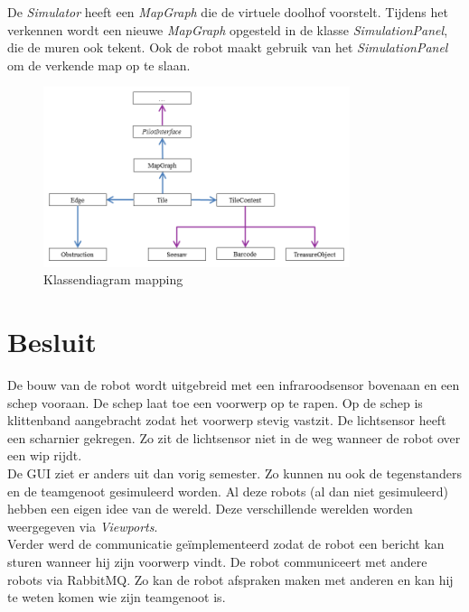 \documentclass[tt2]{penoverslag}
\begin{document}
De \textit{Simulator} heeft een \textit{MapGraph} die de virtuele doolhof voorstelt. Tijdens het verkennen wordt een nieuwe \textit{MapGraph} opgesteld in de klasse \textit{SimulationPanel}, die de muren ook tekent. Ook de robot maakt gebruik van het \textit{SimulationPanel} om de verkende map op te slaan.

\begin{figure}[h]
\centering
	\includegraphics[width=0.8\textwidth]{klasMapping}
\caption{Klassendiagram mapping}
\label{fig:KlasMap}
\end{figure}


\section{Besluit}
De bouw van de robot wordt uitgebreid met een infraroodsensor bovenaan en een schep vooraan. De schep laat toe een voorwerp op te rapen. Op de schep is klittenband aangebracht zodat het voorwerp stevig vastzit. De lichtsensor heeft een scharnier gekregen. Zo zit de lichtsensor niet in de weg wanneer de robot over een wip rijdt. \\

De GUI ziet er anders uit dan vorig semester. Zo kunnen nu ook de tegenstanders en de teamgenoot gesimuleerd worden. Al deze robots (al dan niet gesimuleerd) hebben een eigen idee van de wereld. Deze verschillende werelden worden weergegeven via \textit{Viewports}.\\

Verder werd de communicatie ge\"implementeerd zodat de robot een bericht kan sturen wanneer hij zijn voorwerp vindt. 
De robot communiceert met andere robots via RabbitMQ. Zo kan de robot afspraken maken met anderen en kan hij te weten komen wie zijn teamgenoot is.
 


\newpage
\makeappendix
\end{document}

